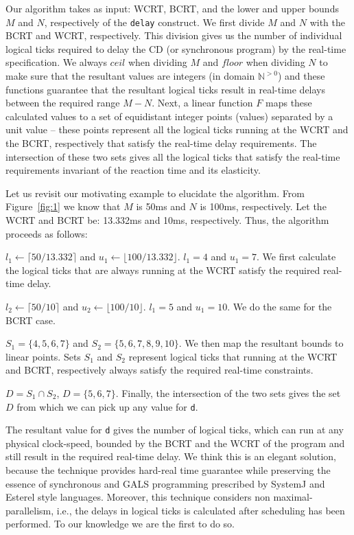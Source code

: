 Our algorithm takes as input: WCRT, BCRT, and the lower and upper bounds
$M$ and $N$, respectively of the \texttt{delay} construct. We first
divide $M$ and $N$ with the BCRT and WCRT, respectively. This division
gives us the number of individual logical ticks required to delay the CD
(or synchronous program) by the real-time specification. We always
$ceil$ when dividing $M$ and $floor$ when dividing $N$ to make sure that
the resultant values are integers (in domain $\mathbb{N}^{>0}$) and
these functions guarantee that the resultant logical ticks result in
real-time delays between the required range $M-N$. Next, a linear
function $F$ maps these calculated values to a set of equidistant
integer points (values) separated by a unit value -- these points
represent all the logical ticks running at the WCRT and the BCRT,
respectively that satisfy the real-time delay requirements. The
intersection of these two sets gives all the logical ticks that satisfy
the real-time requirements invariant of the reaction time and its
elasticity.

Let us revisit our motivating example to elucidate the algorithm. From
Figure~\ref{fig:1} we know that $M$ is 50ms and $N$ is 100ms,
respectively. Let the WCRT and BCRT be: 13.332ms and 10ms,
respectively. Thus, the algorithm proceeds as follows:

\begin{enumerate*}
\item $l_1 \leftarrow \lceil 50/13.332 \rceil$ and $u_1 \leftarrow
  \lfloor 100/13.332 \rfloor$. $l_1 = 4$ and $u_1 = 7$. We first
  calculate the logical ticks that are always running at the WCRT
  satisfy the required real-time delay.
\item $l_2 \leftarrow \lceil 50/10 \rceil$ and $u_2 \leftarrow
  \lfloor 100/10 \rfloor$. $l_1 = 5$ and $u_1 = 10$. We do the same for
  the BCRT case.
\item $S_1 = \{4,5,6,7\}$ and $S_2 =\{5,6,7,8,9,10\}$. We then map the
  resultant bounds to linear points. Sets $S_1$ and $S_2$ represent
  logical ticks that running at the WCRT and BCRT, respectively always
  satisfy the required real-time constraints.
\item $D = S_1 \cap S_2$, $D = \{5,6,7\}$. Finally, the intersection of
  the two sets gives the set $D$ from which we can pick up any value for
  \texttt{d}.
\end{enumerate*}

The resultant value for \texttt{d} gives the number of logical ticks,
which can run at any physical clock-speed, bounded by the BCRT and the
WCRT of the program and still result in the required real-time delay. We
think this is an elegant solution, because the technique provides
hard-real time guarantee while preserving the essence of synchronous and
GALS programming prescribed by SystemJ and Esterel style
languages. Moreover, this technique considers non maximal-parallelism,
i.e., the delays in logical ticks is calculated after scheduling has
been performed. To our knowledge we are the first to do so.

